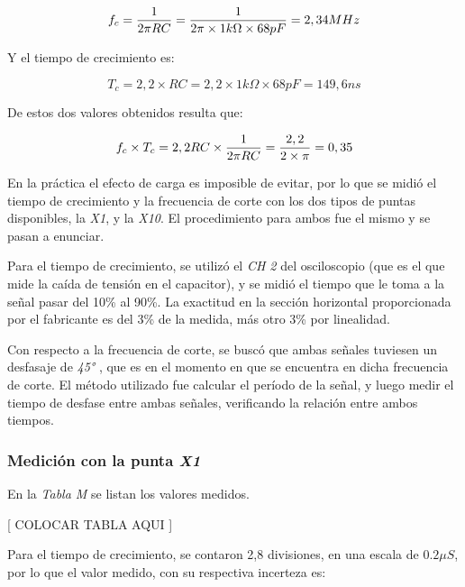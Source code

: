 \documentclass{article}
\begin{document}
\begin{equation*}
	f_c = {1 \over 2 \pi RC} = {1 \over 2 \pi \times 1k\Omega \times 68pF} = 2,34 MHz
\end{equation*}
\medskip

Y el tiempo de crecimiento es:
\medskip

\begin{equation*}
	T_c = 2,2 \times RC = 2,2 \times 1k\Omega \times 68pF = 149,6 ns
\end{equation*}
\medskip

De estos dos valores obtenidos resulta que:
\medskip

\begin{equation*}
	f_c \times T_c = 2,2 RC \times {1 \over 2 \pi RC} = {2,2 \over 2 \times \pi} = 0,35
\end{equation*}
\medskip


	En la práctica el efecto de carga es imposible de evitar, por lo que se midió el tiempo de crecimiento y la frecuencia de corte con los dos tipos de puntas disponibles, la \textit{X1}, y la \textit{X10}. El procedimiento para ambos fue el mismo y se pasan a enunciar.
	\par
	Para el tiempo de crecimiento, se utilizó el \textit{CH 2} del osciloscopio (que es el que mide la caída de tensión en el capacitor), y se midió el tiempo que le toma a la señal pasar del 10\% al 90\%. La exactitud en la sección horizontal proporcionada por el fabricante es del 3\% de la medida, más otro 3\% por linealidad.
	\par
	Con respecto a la frecuencia de corte, se buscó que ambas señales tuviesen un desfasaje de \textit{45°} , que es en el momento en que se encuentra en dicha frecuencia de corte.
El método utilizado fue calcular el período de la señal, y luego medir el tiempo de desfase entre ambas señales, verificando la relación entre ambos tiempos.
\bigskip\medskip



\subsubsection{Medición con la punta \textit{X1}}
	
	En la \textit{Tabla M} se listan los valores medidos.
\bigskip\bigskip


	[ COLOCAR TABLA AQUI ]
	\bigskip\bigskip


	Para el tiempo de crecimiento, se contaron 2,8 divisiones, en una escala de $0.2 \mu S$, por lo que el valor medido, con su respectiva incerteza es: \\
\end{document}
